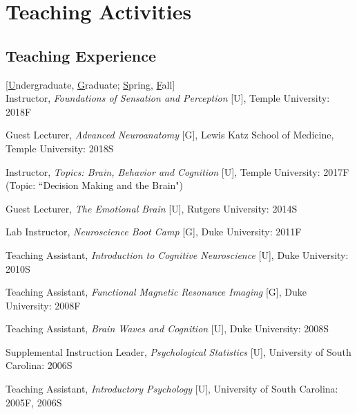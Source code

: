 \documentclass[11pt, letterpaper]{article}
\begin{document}
\section*{Teaching Activities}
\subsection*{Teaching Experience}

[\underline{U}ndergraduate, \underline{G}raduate; \underline{S}pring, \underline{F}all] \\ [.2cm]
Instructor, \textit{Foundations of Sensation and Perception} [U], Temple University: 2018F

Guest Lecturer, \textit{Advanced Neuroanatomy} [G], Lewis Katz School of Medicine, Temple University: 2018S

\begin{hangparas}{.5in}{1}

Instructor, \textit{Topics: Brain, Behavior and Cognition} [U], Temple University: 2017F {\footnotesize (Topic: ``Decision Making and the Brain")}

\end{hangparas}

Guest Lecturer, \textit{The Emotional Brain} [U], Rutgers University: 2014S

Lab Instructor, \textit{Neuroscience Boot Camp} [G], Duke University: 2011F

Teaching Assistant, \textit{Introduction to Cognitive Neuroscience} [U], Duke University: 2010S

Teaching Assistant, \textit{Functional Magnetic Resonance Imaging} [G], Duke University: 2008F

Teaching Assistant, \textit{Brain Waves and Cognition} [U], Duke University: 2008S

Supplemental Instruction Leader, \textit{Psychological Statistics} [U], University of South Carolina: 2006S

Teaching Assistant, \textit{Introductory Psychology} [U], University of South Carolina: 2005F, 2006S \\
\end{document}
